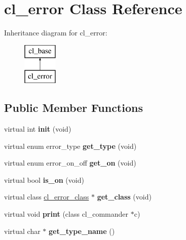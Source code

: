 \hypertarget{classcl__error}{
\section{cl\_\-error Class Reference}
\label{classcl__error}
}
Inheritance diagram for cl\_\-error:\begin{figure}[H]
\begin{center}
\leavevmode
\includegraphics[height=2.000000cm]{classcl__error}
\end{center}
\end{figure}
\subsection*{Public Member Functions}
\begin{DoxyCompactItemize}
\item 
\hypertarget{classcl__error_aa55b52c6ccb658cfe1daebcda9efb5c9}{
virtual int {\bfseries init} (void)}
\label{classcl__error_aa55b52c6ccb658cfe1daebcda9efb5c9}

\item 
\hypertarget{classcl__error_a9ffc63267988da888ddf5bd4a4a57c76}{
virtual enum error\_\-type {\bfseries get\_\-type} (void)}
\label{classcl__error_a9ffc63267988da888ddf5bd4a4a57c76}

\item 
\hypertarget{classcl__error_a7e01970b4abc4b60c5f14cd60ece26fe}{
virtual enum error\_\-on\_\-off {\bfseries get\_\-on} (void)}
\label{classcl__error_a7e01970b4abc4b60c5f14cd60ece26fe}

\item 
\hypertarget{classcl__error_a69d8f21cc6f46aa5af32d795dc17d532}{
virtual bool {\bfseries is\_\-on} (void)}
\label{classcl__error_a69d8f21cc6f46aa5af32d795dc17d532}

\item 
\hypertarget{classcl__error_a41042138fb165126fb471da556261547}{
virtual class \hyperlink{classcl__error__class}{cl\_\-error\_\-class} $\ast$ {\bfseries get\_\-class} (void)}
\label{classcl__error_a41042138fb165126fb471da556261547}

\item 
\hypertarget{classcl__error_a56bdc8cfbfd3520f32e5696e5261d54e}{
virtual void {\bfseries print} (class cl\_\-commander $\ast$c)}
\label{classcl__error_a56bdc8cfbfd3520f32e5696e5261d54e}

\item 
\hypertarget{classcl__error_a9cdcd9d514e68985d84fa3e98cbfdc93}{
virtual char $\ast$ {\bfseries get\_\-type\_\-name} ()}
\label{classcl__error_a9cdcd9d514e68985d84fa3e98cbfdc93}

\end{DoxyCompactItemize}

